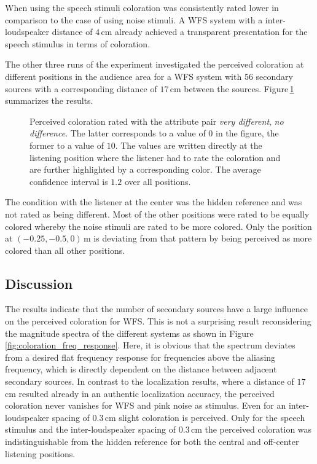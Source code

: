 When using the speech stimuli coloration was consistently rated lower in comparison
to the case of using noise stimuli. A \ac{WFS} system with a inter-loudspeaker
distance of $4$\,cm already achieved a transparent presentation for the speech
stimulus in terms of coloration. 

The other three runs of the experiment investigated the perceived
coloration at different positions in the audience area for a \ac{WFS} system
with 56 secondary sources with a corresponding distance
of $17$\,cm between the sources. Figure\,\ref{fig:wfs_coloration_pos} summarizes
the results.
%
\begin{figure}
    \small
    \centering
    
    \caption{Perceived coloration rated with the attribute pair \emph{very
    different}, \emph{no difference}. The latter corresponds to a value of $0$ in
    the figure, the former to a value of $10$. The values are written directly at
    the listening position where the listener had to rate the coloration and are
    further highlighted by a corresponding color. The average confidence
    interval is $1.2$ over all positions.
    }
    \label{fig:wfs_coloration_pos}
\end{figure}
%
The condition with the listener at the center was the hidden reference and was
not rated as being different. Most of the other positions were rated to be
equally colored whereby the noise stimuli are rated to be more colored.
Only the position at $(-0.25,-0.5,0)$\,m is
deviating from that pattern by being perceived as more colored than all other
positions.



\subsection{Discussion}
\label{sec:wfs_coloration_discussion}
%
The results indicate that the number of secondary sources have a large influence
on the perceived coloration for \ac{WFS}. This is not a surprising result
reconsidering the magnitude spectra of the different systems as shown in
Figure\,\ref{fig:coloration_freq_response}. Here, it is obvious that the spectrum
deviates from a desired flat frequency response for frequencies above the aliasing
frequency, which is directly dependent on the distance between adjacent secondary
sources.
In contrast to the localization results, where a distance of $17$\,cm resulted
already in an authentic localization accuracy, the perceived coloration never
vanishes for \ac{WFS} and pink noise as stimulus. Even for an inter-loudspeaker
spacing of $0.3$\,cm slight coloration is perceived. 
Only for the speech stimulus and the inter-loudspeaker spacing of $0.3$\,cm the perceived
coloration was indistinguishable from the hidden reference for both the central
and off-center listening positions.

